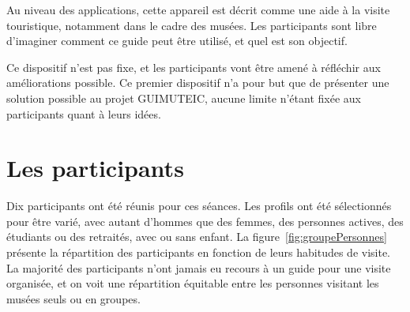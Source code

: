 Au niveau des applications, cette appareil est décrit comme une aide à la visite touristique, notamment dans le cadre des musées.
Les participants sont libre d’imaginer comment ce guide peut être utilisé, et quel est son objectif.

Ce dispositif n’est pas fixe, et les participants vont être amené à réfléchir aux améliorations possible.
Ce premier dispositif n’a pour but que de présenter une solution possible au projet GUIMUTEIC, aucune limite n’étant fixée aux participants quant à leurs idées.


\section{Les participants}

Dix participants ont été réunis pour ces séances.
Les profils ont été sélectionnés pour être varié, avec autant d'hommes que des femmes, des personnes actives, des étudiants ou des retraités, avec ou sans enfant.
La figure~\ref{fig:groupePersonnes} présente la répartition des participants en fonction de leurs habitudes de visite.
La majorité des participants n'ont jamais eu recours à un guide pour une visite organisée, et on voit une répartition équitable entre les personnes visitant les musées seuls ou en groupes.


